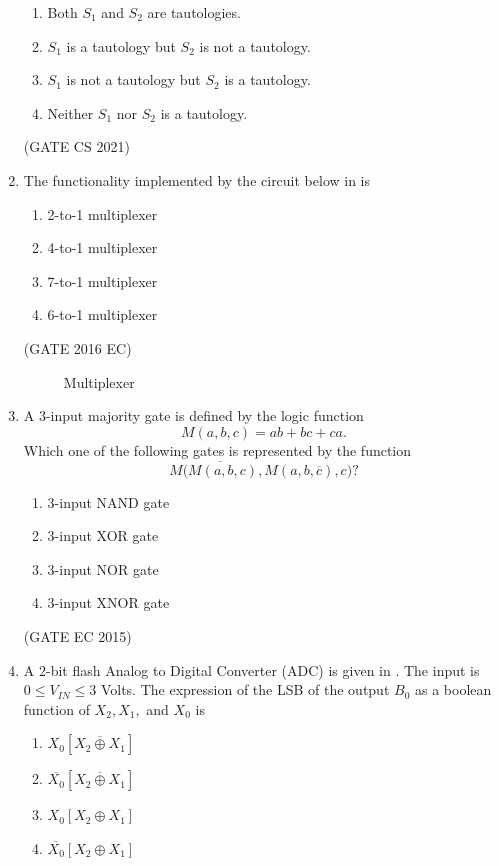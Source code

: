 \begin{enumerate}[label=\arabic*.,ref=\theenumi]
\begin{enumerate}
			\item Both $S_1$ and $S_2$ are tautologies.
			\item $S_1$ is a tautology but $S_2$ is not a tautology.
			\item $S_1$ is not a tautology but $S_2$ is a tautology.
			\item Neither $S_1$ nor $S_2$ is a tautology.
		\end{enumerate}
		                                          \hfill(GATE CS 2021)
\item The functionality implemented by the circuit below 
in
	is 
\begin{enumerate}
\item 2-to-1 multiplexer
\item 4-to-1 multiplexer
\item 7-to-1 multiplexer
\item 6-to-1 multiplexer
\end{enumerate}
\hfill (GATE 2016 EC)
%
\begin{figure}[H]
\centering
\resizebox{0.5\columnwidth}{!}{%

	}
\caption{Multiplexer}
\label{fig:gate_ec_2016_43}
\end{figure}
%
\item A 3-input majority gate is defined by the logic function 
	$$M(a, b, c) = ab + bc + ca.$$ Which one of the following gates is represented by the function $$M\overline{(M(a, b, c)}, M(a, b, \overline{c}), c)?$$
\begin{enumerate}
    \item 3-input NAND gate 
    \item 3-input XOR gate 
    \item 3-input NOR gate 
    \item 3-input XNOR gate 
\end{enumerate}
    \hfill(GATE EC 2015)
%
\item A $2$-bit flash Analog to Digital Converter (ADC) is given in . The input is $0 \leq V_{IN} \leq 3$ Volts. The expression of the LSB of the output $B_0$ as a boolean function of $X_2,X_1,$ and $X_0$ is 
\begin{enumerate}
\item $X_0 \left[ \overline {X_2 \oplus X_1} \right]$
\item $\overline {X_0} \left[ \overline {X_2 \oplus X_1} \right]$
\item $X_0 \left[ X_2 \oplus X_1 \right]$
\item $\overline{X_0} \left[ X_2 \oplus X_1 \right]$

\end{enumerate}
\end{enumerate}
